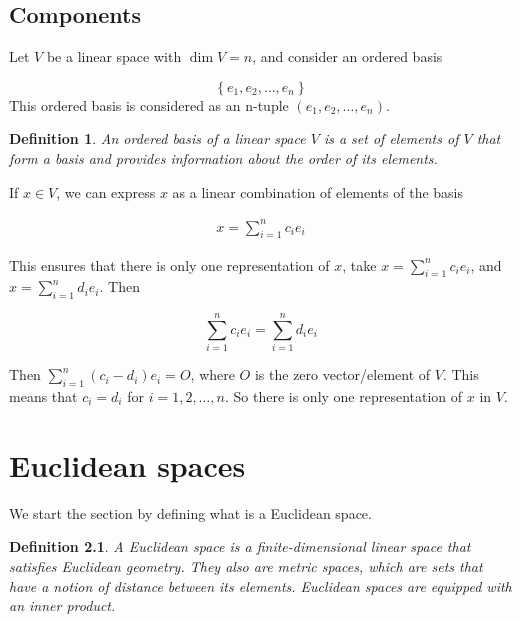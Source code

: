 \documentclass{book}
\newtheorem{definition}{Definition}[section]
\begin{document}
\section{Components}

Let $V$ be a linear space with $\dim V = n$, and consider an ordered basis

\[\left\{e_1, e_2,\dots,e_n\right\}\]
This ordered basis is considered as an n-tuple
$\left(e_1,e_2,\dots,e_n\right)$.

\begin{definition}
    An ordered basis of a linear space $V$ is a set of elements of $V$ that form a basis and provides information
    about the order of its elements.
\end{definition}

If $x\in V$, we can express $x$ as a linear combination of elements of the
basis

\begin{equation}
    \begin{split}
        x=\sum_{i=1}^{n}{c_i e_i}
    \end{split}
\end{equation}

This ensures that there is only one representation of $x$, take $x =
    \sum_{i=1}^{n}{c_i e_i}$, and $x = \sum_{i=1}^{n}{d_i e_i}$. Then

\[
    \sum_{i=1}^{n}{c_i e_i} = \sum_{i=1}^{n}{d_i e_i}
\]

Then $\sum_{i=1}^{n}{(c_i - d_i) e_i} = O$, where $O$ is the zero
vector/element of $V$. This means that $c_i=d_i$ for $i=1,2,\dots,n$. So there
is only one representation of $x$ in $V$.

\chapter{Euclidean spaces}

We start the section by defining what is a Euclidean space.

\begin{definition}
    A \textit{Euclidean space} is a finite-dimensional linear space that satisfies
    Euclidean geometry. They also are metric spaces, which are sets that have a notion
    of distance between its elements. Euclidean spaces are equipped with an \textit{inner product}.
\end{definition}
\end{document}
